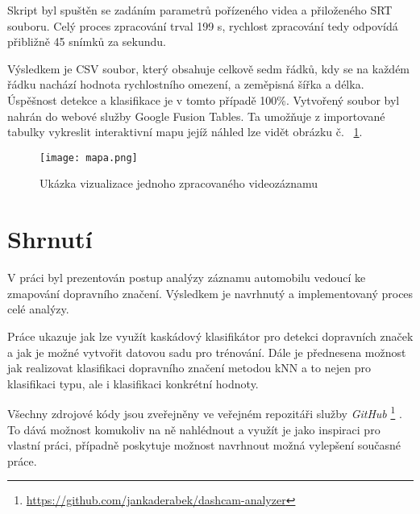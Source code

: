 \documentclass[czech]{ExcelAtFIT} %
\begin{document}
Skript byl spuštěn se zadáním parametrů pořízeného videa a  přiloženého SRT souboru. Celý proces zpracování trval 199 s,  rychlost zpracování tedy odpovídá přibližně 45 snímků za sekundu.

Výsledkem je CSV soubor, který obsahuje celkově sedm řádků,  kdy se na každém řádku nachází hodnota rychlostního omezení, a zeměpisná šířka a délka. Úspěšnost detekce a klasifikace je v tomto případě 100\%. Vytvořený soubor byl nahrán do webové služby Google Fusion Tables. Ta umožňuje z  importované tabulky vykreslit  interaktivní mapu jejíž náhled  lze vidět obrázku č. ~\ref{fig:RecordPreview}.


\begin{figure}[t!]
\centering
\texttt{[image: mapa.png]}\\[1pt]
\caption{Ukázka vizualizace jednoho zpracovaného videozáznamu}
  \label{fig:RecordPreview}
\end{figure}



\section{Shrnutí}
\label{sec:Conclusions}

V práci byl prezentován postup analýzy záznamu automobilu vedoucí ke zmapování dopravního značení. Výsledkem je navrhnutý a implementovaný proces celé analýzy.

Práce ukazuje jak lze využít kaskádový klasifikátor pro detekci dopravních značek a jak je možné vytvořit datovou sadu pro trénování.  Dále je přednesena možnost jak realizovat klasifikaci dopravního značení metodou kNN a to nejen pro klasifikaci typu, ale i klasifikaci konkrétní hodnoty.

Všechny zdrojové kódy jsou zveřejněny ve veřejném repozitáři služby \emph{GitHub}%
	  \footnote{\url{https://github.com/jankaderabek/dashcam-analyzer}} . To dává možnost komukoliv na ně nahlédnout a využít je jako inspiraci pro vlastní práci, případně poskytuje možnost navrhnout možná vylepšení současné práce. 
\end{document}

